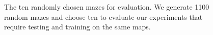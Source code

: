 \begin{figure}[t!]%
\centering%

\caption{The ten randomly chosen mazes for evaluation. We generate 1100 random mazes and choose ten to evaluate our experiments that require testing and training on the same maps.}%
\label{fig:environments}
\end{figure}
